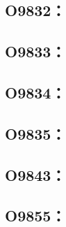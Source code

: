 \subsection{O9832：}



\clearpage
\subsection{O9833：}



\clearpage
\subsection{O9834：}



\clearpage
\subsection{O9835：}



\clearpage
\subsection{O9843：}



\clearpage
\subsection{O9855：}




